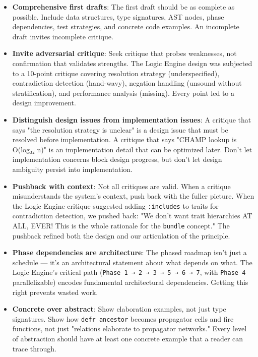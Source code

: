 \documentclass[11pt]{article}
\begin{document}
\begin{itemize}
\item \textbf{Comprehensive first drafts}: The first draft should be as complete
as possible. Include data structures, type signatures, AST nodes,
phase dependencies, test strategies, and concrete code examples.
An incomplete draft invites incomplete critique.

\item \textbf{Invite adversarial critique}: Seek critique that probes weaknesses,
not confirmation that validates strengths. The Logic Engine design
was subjected to a 10-point critique covering resolution strategy
(underspecified), contradiction detection (hand-wavy), negation
handling (unsound without stratification), and performance analysis
(missing). Every point led to a design improvement.

\item \textbf{Distinguish design issues from implementation issues}: A critique
that says "the resolution strategy is unclear" is a design issue
that must be resolved before implementation. A critique that says
"CHAMP lookup is O(log₃₂ n)" is an implementation detail that can
be optimized later. Don't let implementation concerns block design
progress, but don't let design ambiguity persist into implementation.

\item \textbf{Pushback with context}: Not all critiques are valid. When a critique
misunderstands the system's context, push back with the fuller picture.
When the Logic Engine critique suggested adding \texttt{:includes} to traits
for contradiction detection, we pushed back: "We don't want trait
hierarchies AT ALL, EVER! This is the whole rationale for the \texttt{bundle}
concept." The pushback refined both the design and our articulation of
the principle.

\item \textbf{Phase dependencies are architecture}: The phased roadmap isn't just
a schedule --- it's an architectural statement about what depends on
what. The Logic Engine's critical path
(\texttt{Phase 1 → 2 → 3 → 5 → 6 → 7}, with \texttt{Phase 4} parallelizable)
encodes fundamental architectural dependencies. Getting this right
prevents wasted work.

\item \textbf{Concrete over abstract}: Show elaboration examples, not just type
signatures. Show how \texttt{defr ancestor} becomes propagator cells and
fire functions, not just "relations elaborate to propagator networks."
Every level of abstraction should have at least one concrete example
that a reader can trace through.
\end{itemize}
\end{document}
